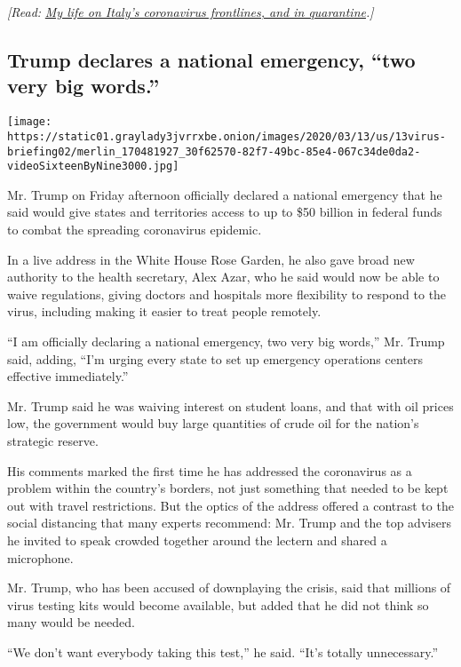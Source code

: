 \emph{{[}Read:}
\href{http://www.nytimes3xbfgragh.onion/2020/03/19/world/europe/italy-coronavirus-frontlines-quarantine.html}{\emph{My
life on Italy's coronavirus frontlines, and in quarantine}}\emph{.{]}}

\hypertarget{trump-declares-a-national-emergency-two-very-big-words}{%
\subsection{Trump declares a national emergency, ``two very big
words.''}\label{trump-declares-a-national-emergency-two-very-big-words}}

\texttt{[image: https://static01.graylady3jvrrxbe.onion/images/2020/03/13/us/13virus-briefing02/merlin\_170481927\_30f62570-82f7-49bc-85e4-067c34de0da2-videoSixteenByNine3000.jpg]}

Mr. Trump on Friday afternoon officially declared a national emergency
that he said would give states and territories access to up to \$50
billion in federal funds to combat the spreading coronavirus epidemic.

In a live address in the White House Rose Garden, he also gave broad new
authority to the health secretary, Alex Azar, who he said would now be
able to waive regulations, giving doctors and hospitals more flexibility
to respond to the virus, including making it easier to treat people
remotely.

``I am officially declaring a national emergency, two very big words,''
Mr. Trump said, adding, ``I'm urging every state to set up emergency
operations centers effective immediately.''

Mr. Trump said he was waiving interest on student loans, and that with
oil prices low, the government would buy large quantities of crude oil
for the nation's strategic reserve.

His comments marked the first time he has addressed the coronavirus as a
problem within the country's borders, not just something that needed to
be kept out with travel restrictions. But the optics of the address
offered a contrast to the social distancing that many experts recommend:
Mr. Trump and the top advisers he invited to speak crowded together
around the lectern and shared a microphone.

Mr. Trump, who has been accused of downplaying the crisis, said that
millions of virus testing kits would become available, but added that he
did not think so many would be needed.

``We don't want everybody taking this test,'' he said. ``It's totally
unnecessary.''

